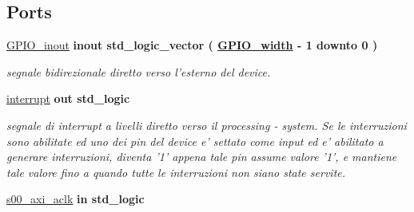 \subsection*{Ports}
 \begin{DoxyCompactItemize}
\item 
\hypertarget{group___a_x_i-device_ga8829699d739ef35a4c5da396ffd38387}{\hyperlink{group___a_x_i-device_ga8829699d739ef35a4c5da396ffd38387}{G\+P\+I\+O\+\_\+inout}  {\bfseries {\bfseries \textcolor{vhdlchar}{inout}\textcolor{vhdlchar}{ }}} {\bfseries \textcolor{vhdlchar}{std\+\_\+logic\+\_\+vector}\textcolor{vhdlchar}{ }\textcolor{vhdlchar}{(}\textcolor{vhdlchar}{ }\textcolor{vhdlchar}{ }\textcolor{vhdlchar}{ }\textcolor{vhdlchar}{ }{\bfseries \hyperlink{group___a_x_i-device_ga0b52ca75e9a6093b2b60d5e851803069}{G\+P\+I\+O\+\_\+width}} \textcolor{vhdlchar}{-\/}\textcolor{vhdlchar}{ } \textcolor{vhdldigit}{1} \textcolor{vhdlchar}{ }\textcolor{vhdlchar}{downto}\textcolor{vhdlchar}{ }\textcolor{vhdlchar}{ } \textcolor{vhdldigit}{0} \textcolor{vhdlchar}{ }\textcolor{vhdlchar}{)}\textcolor{vhdlchar}{ }} }\label{group___a_x_i-device_ga8829699d739ef35a4c5da396ffd38387}

\begin{DoxyCompactList}\small\item\em segnale bidirezionale diretto verso l'esterno del device. \end{DoxyCompactList}\item 
\hypertarget{group___a_x_i-device_ga5b78f3e3edfaf6e8ec79031b9e631e9d}{\hyperlink{group___a_x_i-device_ga5b78f3e3edfaf6e8ec79031b9e631e9d}{interrupt}  {\bfseries {\bfseries \textcolor{vhdlchar}{out}\textcolor{vhdlchar}{ }}} {\bfseries \textcolor{vhdlchar}{std\+\_\+logic}\textcolor{vhdlchar}{ }} }\label{group___a_x_i-device_ga5b78f3e3edfaf6e8ec79031b9e631e9d}

\begin{DoxyCompactList}\small\item\em segnale di interrupt a livelli diretto verso il processing -\/ system. Se le interruzioni sono abilitate ed uno dei pin del device e' settato come input ed e' abilitato a generare interruzioni, diventa '1' appena tale pin assume valore '1', e mantiene tale valore fino a quando tutte le interruzioni non siano state servite. \end{DoxyCompactList}\item 
\hypertarget{group___a_x_i-device_ga037f9e3df8559bfd59db37bcba9cb7a8}{\hyperlink{group___a_x_i-device_ga037f9e3df8559bfd59db37bcba9cb7a8}{s00\+\_\+axi\+\_\+aclk}  {\bfseries {\bfseries \textcolor{vhdlchar}{in}\textcolor{vhdlchar}{ }}} {\bfseries \textcolor{vhdlchar}{std\+\_\+logic}\textcolor{vhdlchar}{ }} }\label{group___a_x_i-device_ga037f9e3df8559bfd59db37bcba9cb7a8}


\end{DoxyCompactItemize}
